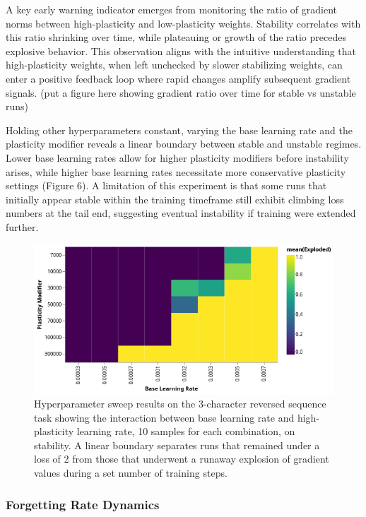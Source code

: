 \documentclass{article} %
\begin{document}
A key early warning indicator emerges from monitoring the ratio of gradient norms between high-plasticity and low-plasticity weights. Stability correlates with this ratio shrinking over time, while plateauing or growth of the ratio precedes explosive behavior. This observation aligns with the intuitive understanding that high-plasticity weights, when left unchecked by slower stabilizing weights, can enter a positive feedback loop where rapid changes amplify subsequent gradient signals.
(put a figure here showing gradient ratio over time for stable vs unstable runs)

Holding other hyperparameters constant, varying the base learning rate and the plasticity modifier reveals a linear boundary between stable and unstable regimes. Lower base learning rates allow for higher plasticity modifiers before instability arises, while higher base learning rates necessitate more conservative plasticity settings (Figure 6). A limitation of this experiment is that some runs that initially appear stable within the training timeframe still exhibit climbing loss numbers at the tail end, suggesting eventual instability if training were extended further. 
\begin{figure}[h]
\begin{center}
\includegraphics[width=0.8\linewidth]{figure_6.png}
\caption{Hyperparameter sweep results on the 3-character reversed sequence task showing the interaction between base learning rate and high-plasticity learning rate, 10 samples for each combination, on stability. A linear boundary separates runs that remained under a loss of 2 from those that underwent a runaway explosion of gradient values during a set number of training steps.}
\label{fig:hyperparameter_sweep_6}
\end{center}
\end{figure}

\subsubsection{Forgetting Rate Dynamics}
\end{document}
